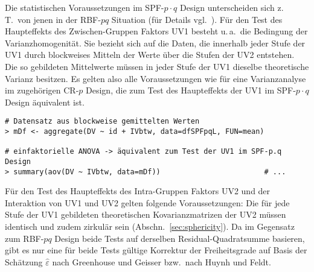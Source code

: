 Die statistischen Voraussetzungen im SPF-$p \cdot q$ Design unterscheiden sich z.\,T.\ von jenen in der RBF-$pq$ Situation (für Details vgl.\ ). Für den Test des Haupteffekts des Zwischen-Gruppen Faktors UV1 besteht u.\,a.\ die Bedingung der Varianzhomogenität. Sie bezieht sich auf die Daten, die innerhalb jeder Stufe der UV1 durch blockweises Mitteln der Werte über die Stufen der UV2 entstehen. Die so gebildeten Mittelwerte müssen in jeder Stufe der UV1 dieselbe theoretische Varianz besitzen. Es gelten also alle Voraussetzungen wie für eine Varianzanalyse im zugehörigen CR-$p$ Design, die zum Test des Haupteffekts der UV1 im SPF-$p \cdot q$ Design äquivalent ist.
\begin{lstlisting}
# Datensatz aus blockweise gemittelten Werten
> mDf <- aggregate(DV ~ id + IVbtw, data=dfSPFpqL, FUN=mean)

# einfaktorielle ANOVA -> äquivalent zum Test der UV1 im SPF-p.q Design
> summary(aov(DV ~ IVbtw, data=mDf))                        # ...
\end{lstlisting}

Für den Test des Haupteffekts des Intra-Gruppen Faktors UV2 und der Interaktion von UV1 und UV2 gelten folgende Voraussetzungen: Die für jede Stufe der UV1 gebildeten theoretischen Kovarianzmatrizen der UV2 müssen identisch und zudem zirkulär sein (Abschn.\ \ref{sec:sphericity}). Da im Gegensatz zum RBF-$pq$ Design beide Tests auf derselben Residual-Quadratsumme basieren, gibt es nur eine für beide Tests gültige Korrektur der Freiheitsgrade auf Basis der Schätzung $\hat{\varepsilon}$ nach Greenhouse und Geisser bzw.\ nach Huynh und Feldt.

